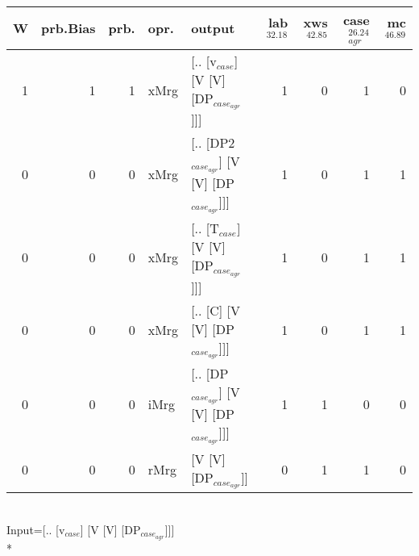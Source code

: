 \begin{tabularx}{\linewidth}{rrrlXrrrr}
\hline
   W &   prb.Bias &   prb. & opr.   & output                                    &   lab$^{32.18}$ &   xws$^{42.85}$ &   case$_{agr}^{26.24}$ &   mc$^{46.89}$ \\
\hline
   1 &       1 &   1 & xMrg & [.. [v$_{case}$] [V [V] [DP$_{case_{agr}}$]]]       &             1 &             0 &                  1 &            0 \\
   0 &       0 &   0 & xMrg & [.. [DP2$_{case_{agr}}$] [V [V] [DP$_{case_{agr}}$]]] &             1 &             0 &                  1 &            1 \\
   0 &       0 &   0 & xMrg & [.. [T$_{case}$] [V [V] [DP$_{case_{agr}}$]]]       &             1 &             0 &                  1 &            1 \\
   0 &       0 &   0 & xMrg & [.. [C] [V [V] [DP$_{case_{agr}}$]]]            &             1 &             0 &                  1 &            1 \\
   0 &       0 &   0 & iMrg & [.. [DP$_{case_{agr}}$] [V [V] [DP$_{case_{agr}}$]]]  &             1 &             1 &                  0 &            0 \\
   0 &       0 &   0 & rMrg & [V [V] [DP$_{case_{agr}}$]]                     &             0 &             1 &                  1 &            0 \\
\hline
\end{tabularx}\endgroup\\
\begingroup\scriptsize Input=[.. [v$_{case}$] [V [V] [DP$_{case_{agr}}$]]]\\*
